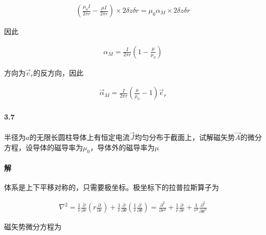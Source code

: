 \documentclass{article}
\newcommand*{\Jmath}{J}
\begin{document}
\begin{equation*}
  \begin{aligned}
    \left( \frac{\mu_{0} I}{2\pi r} - \frac{\mu I}{2\pi r} \right) \times 2 \delta z \delta r
    = \mu_0 \alpha_M \times 2 \delta z \delta r
  \end{aligned}
\end{equation*}

因此

\begin{equation*}
  \begin{aligned}
    \alpha_M = \frac{I}{2\pi r} \left( 1 - \frac{\mu}{\mu_{0}} \right)
  \end{aligned}
\end{equation*}

方向为$\vec{e}_r$的反方向，因此

\begin{equation*}
  \begin{aligned}
    \vec{\alpha}_M = \frac{I}{2\pi r} \left( \frac{\mu}{\mu_{0}} - 1 \right) \vec{e}_r
  \end{aligned}
\end{equation*}

\paragraph{3.7}

半径为$a$的无限长圆柱导体上有恒定电流$\vec{\Jmath}$均匀分布于截面上，试解磁矢势$\vec{A}$的微分方程，设导体的磁导率为$\mu_0$，导体外的磁导率为$\mu$

\paragraph{解}

体系是上下平移对称的，只需要极坐标。极坐标下的拉普拉斯算子为

\begin{equation*}
  \begin{aligned}
    \nabla^2 = \frac{1}{r} \frac{\partial}{\partial r} \left( r \frac{\partial}{\partial r} \right)
    + \frac{1}{r} \frac{\partial}{\partial \theta} \left( \frac{1}{r} \frac{\partial}{\partial \theta} \right)
    = \frac{\partial^{2}}{\partial r^2} + \frac{1}{r} \frac{\partial}{\partial r} + \frac{1}{r^{2}} \frac{\partial^{2}}{\partial \theta^2}
  \end{aligned}
\end{equation*}

磁矢势微分方程为
\end{document}
